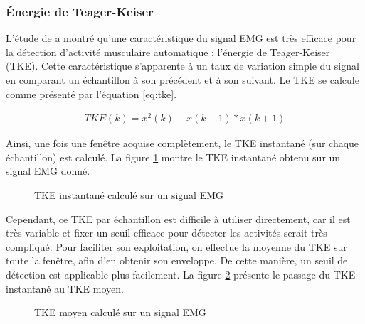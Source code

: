 \documentclass[letterpaper, twoside, 12pt, memoire, creativecommons, hyperref]{thETS}
\begin{document}
\subsubsection{Énergie de Teager-Keiser}

L'étude de \cite{li2007} a montré qu'une caractéristique du signal EMG est très efficace pour la détection d'activité musculaire automatique : l'énergie de Teager-Keiser (TKE). Cette caractéristique s'apparente à un taux de variation simple du signal en comparant un échantillon à son précédent et à son suivant. Le TKE se calcule comme présenté par l'équation \ref{eq:tke}.

\begin{align}\label{eq:tke}
   TKE(k) = x^2(k) - x(k-1)*x(k+1) 
\end{align}

Ainsi, une fois une fenêtre acquise complètement, le TKE instantané (sur chaque échantillon) est calculé. La figure \ref{fig:tkeinstant} montre le TKE instantané obtenu sur un signal EMG donné.

\begin{figure}
	\centering
	\caption{TKE instantané calculé sur un signal EMG}
	\label{fig:tkeinstant}
\end{figure}

Cependant, ce TKE par échantillon est difficile à utiliser directement, car il est très variable et fixer un seuil efficace pour détecter les activités serait très compliqué. Pour faciliter son exploitation, on effectue la moyenne du TKE sur toute la fenêtre, afin d'en obtenir son enveloppe. De cette manière, un seuil de détection est applicable plus facilement. La figure \ref{fig:tkemoy} présente le passage du TKE instantané au TKE moyen.

\begin{figure}
	\centering
	\caption{TKE moyen calculé sur un signal EMG}
	\label{fig:tkemoy}
\end{figure}
\end{document}
